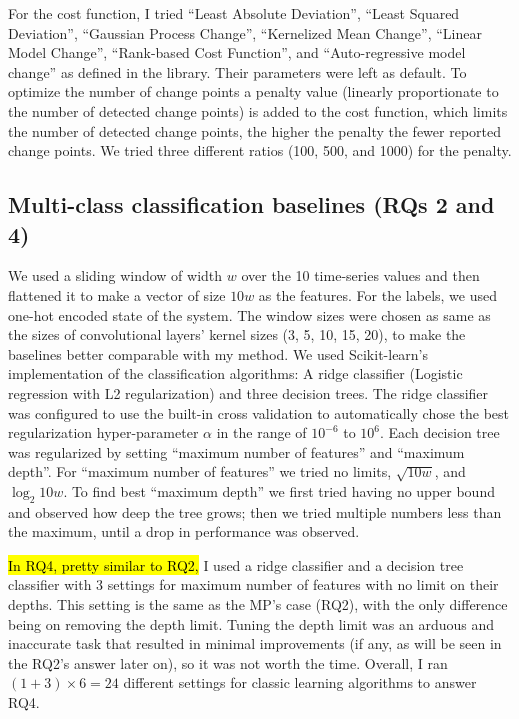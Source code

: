 For the cost function, I tried ``Least Absolute Deviation'', ``Least Squared Deviation'', ``Gaussian Process Change'', ``Kernelized Mean Change'', ``Linear Model Change'', ``Rank-based Cost Function'', and ``Auto-regressive model change'' as defined in the library. Their parameters were left as default.
To optimize the number of change points a penalty value (linearly proportionate to the number of detected change points) is added to the cost function, which limits the number of detected change points, the higher the penalty the fewer reported change points. We tried three different ratios (100, 500, and 1000) for the penalty.

\subsection{Multi-class classification baselines (RQs 2 and 4)}
We used a sliding window of width $w$ over the 10 time-series values and then flattened it to make a vector of size $10w$ as the features. For the labels, we used one-hot encoded state of the system.
The window sizes were chosen as same as the sizes of convolutional layers' kernel sizes (3, 5, 10, 15, 20), to make the baselines better comparable with my method. 
We used Scikit-learn's implementation of the classification algorithms: A ridge classifier (Logistic regression with L2 regularization) and three decision trees. The ridge classifier was configured to use the built-in cross validation to automatically chose the best regularization hyper-parameter $\alpha$ in the range of $10^{-6}$ to $10^6$. Each decision tree was regularized by setting ``maximum number of features'' and ``maximum depth''. For ``maximum number of features'' we tried no limits, $\sqrt{10w}$, and $\log_2{10w}$. To find best ``maximum depth'' we first tried having no upper bound and observed how deep the tree grows; then we tried multiple numbers less than the maximum, until a drop in performance was observed. 

\hl{In RQ4, pretty similar to RQ2,} I used a ridge classifier and a decision tree classifier with 3 settings for maximum number of features with no limit on their depths. This setting is the same as the MP's case (RQ2), with the only difference being on removing the depth limit. Tuning the depth limit was an arduous and inaccurate task that resulted in minimal improvements (if any, as will be seen in the RQ2's answer later on), so it was not worth the time. Overall, I ran $(1+3)\times6=24$ different settings for classic learning algorithms to answer RQ4. 



